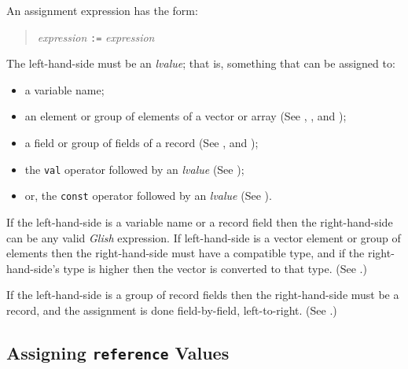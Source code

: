 An assignment expression has the form:
\begin{quote}
    {\em expression} {\tt :=} {\em expression}
\end{quote}
The left-hand-side must be an {\em lvalue}; that is, something that
can be assigned to:
\begin{itemize}
\item a variable name;
\item an element or group of elements of a vector or array
(See , , and );
\item a field or group of fields of a record
(See , and );
\item the {\tt val} operator followed by an {\em lvalue} (See );
\item or, the {\tt const} operator followed by an {\em lvalue} (See ).
\end{itemize}

If the left-hand-side is a variable name or a record field then
the right-hand-side can be any valid {\em Glish} expression.  If
left-hand-side is  a
vector element or group of elements then the right-hand-side must
have a compatible type, and if the right-hand-side's type is higher
then the vector is converted to that type.  (See .)

If the left-hand-side is a group of record fields then the right-hand-side
must be a record, and the assignment is done field-by-field, left-to-right.
(See .)

\subsection{Assigning {\tt reference} Values}

